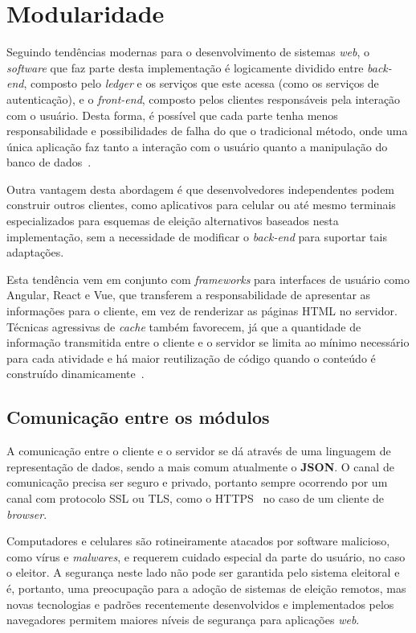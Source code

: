 \section{Modularidade}

Seguindo tendências modernas para o desenvolvimento de sistemas \textit{web}, o
\textit{software} que faz parte desta implementação é logicamente dividido
entre \textit{back-end}, composto pelo \textit{ledger} e os serviços que este
acessa (como os serviços de autenticação), e o \textit{front-end}, composto
pelos clientes responsáveis pela interação com o usuário. Desta forma, é
possível que cada parte tenha menos responsabilidade e possibilidades de falha
do que o tradicional método, onde uma única aplicação faz tanto a interação com
o usuário quanto a manipulação do banco de dados~\cite{lanthaler2012using}.

Outra vantagem desta abordagem é que desenvolvedores independentes podem
construir outros clientes, como aplicativos para celular ou até mesmo terminais
especializados para esquemas de eleição alternativos baseados nesta
implementação, sem a necessidade de modificar o \textit{back-end} para suportar
tais adaptações.

Esta tendência vem em conjunto com \textit{frameworks} para interfaces de
usuário como Angular, React e Vue, que transferem a responsabilidade de
apresentar as informações para o cliente, em vez de renderizar as páginas HTML
no servidor. Técnicas agressivas de \textit{cache} também favorecem, já que a
quantidade de informação transmitida entre o cliente e o servidor se limita ao
mínimo necessário para cada atividade e há maior reutilização de código quando
o conteúdo é construído dinamicamente~\cite{souders2008high}.

\subsection{Comunicação entre os módulos}

A comunicação entre o cliente e o servidor se dá através de uma linguagem de
representação de dados, sendo a mais comum atualmente o \textbf{JSON}. O canal
de comunicação precisa ser seguro e privado, portanto sempre ocorrendo por um
canal com protocolo SSL ou TLS, como o HTTPS~\cite{rfc2818} no caso de um
cliente de \textit{browser}.

Computadores e celulares são rotineiramente atacados por software malicioso,
como vírus e \textit{malwares}, e requerem cuidado especial da parte do
usuário, no caso o eleitor. A segurança neste lado não pode ser garantida pelo
sistema eleitoral e é, portanto, uma preocupação para a adoção de sistemas de
eleição remotos, mas novas tecnologias e padrões recentemente desenvolvidos e
implementados pelos navegadores permitem maiores níveis de segurança para
aplicações \textit{web}.

